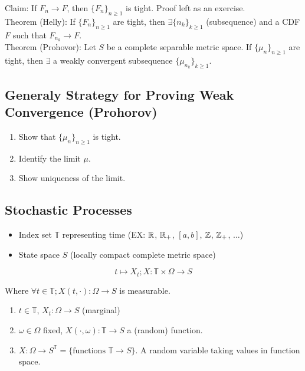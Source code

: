 \documentclass[english, 11pt]{article}
\begin{document}
Claim: If $F_n \to F$, then $\{F_n\}_{n \geq 1}$ is tight. Proof left as an exercise.\\

Theorem (Helly): If $\{F_n\}_{n \geq 1}$ are tight, then $\exists \{n_k\}_{k \geq 1}$ (subsequence) and a CDF $F$ such that $F_{n_k} \to F$.\\

Theorem (Prohovor): Let $S$ be a complete separable metric space. If $\{\mu_n\}_{n \geq 1}$ are tight, then $\exists$ a weakly convergent subsequence $\{\mu_{n_k}\}_{k \geq 1}$.\\

\subsection{Generaly Strategy for Proving Weak Convergence (Prohorov)}

\begin{enumerate}
	\item Show that $\{\mu_n\}_{n \geq 1}$ is tight.
	\item Identify the limit $\mu$.
	\item Show uniqueness of the limit.
\end{enumerate}

\subsection{Stochastic Processes}

\begin{itemize}
	\item Index set $\mathbb{T}$ representing time (EX: ${\mathbb{R}}$, ${\mathbb{R}}_+$, $[a, b]$, ${\mathbb{Z}}$, ${\mathbb{Z}}_+$, $\dots$)
	\item State space $S$ (locally compact complete metric space)
\end{itemize}

\[t \mapsto X_t; X: \mathbb{T} \times \Omega \to S\]

Where $\forall t \in \mathbb{T}; X(t, \cdot): \Omega \to S$ is measurable.

\begin{enumerate}
	\item $t \in \mathbb{T}$, $X_t: \Omega \to S$ (marginal)
	\item $\omega \in \Omega$ fixed, $X(\cdot, \omega): \mathbb{T} \to S$ a (random) function.
	\item $X: \Omega \to S^{\mathbb{T}} = \{\text{functions } \mathbb{T} \to S\}$. A random variable taking values in function space. 
\end{enumerate}
\end{document}
